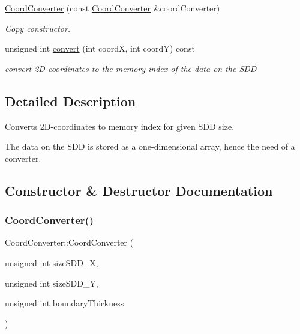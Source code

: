 \begin{DoxyCompactItemize}
\hyperlink{classCoordConverter_af11209a489a46dd335db0635d811999d}{Coord\+Converter} (const \hyperlink{classCoordConverter}{Coord\+Converter} \&coord\+Converter)
\begin{DoxyCompactList}\small\item\em Copy constructor. \end{DoxyCompactList}\item 
\mbox{\label{classCoordConverter_ae62fc899a25ed7b6455927a6ddcccf52}} 
unsigned int \hyperlink{classCoordConverter_ae62fc899a25ed7b6455927a6ddcccf52}{convert} (int coordX, int coordY) const
\begin{DoxyCompactList}\small\item\em convert 2\+D-\/coordinates to the memory index of the data on the S\+DD \end{DoxyCompactList}\end{DoxyCompactItemize}


\subsection{Detailed Description}
Converts 2\+D-\/coordinates to memory index for given S\+DD size. 

The data on the S\+DD is stored as a one-\/dimensional array, hence the need of a converter. 

\subsection{Constructor \& Destructor Documentation}
\mbox{\label{classCoordConverter_a0e773a3ee5461119d7ff285fde45427d}} 
\subsubsection{\texorpdfstring{Coord\+Converter()}{CoordConverter()}\hspace{0.1cm}{\footnotesize\ttfamily [1/4]}}
{\footnotesize\ttfamily Coord\+Converter\+::\+Coord\+Converter (\begin{DoxyParamCaption}\item[{unsigned int}]{size\+S\+D\+D\+\_\+X,  }\item[{unsigned int}]{size\+S\+D\+D\+\_\+Y,  }\item[{unsigned int}]{boundary\+Thickness }\end{DoxyParamCaption})}



